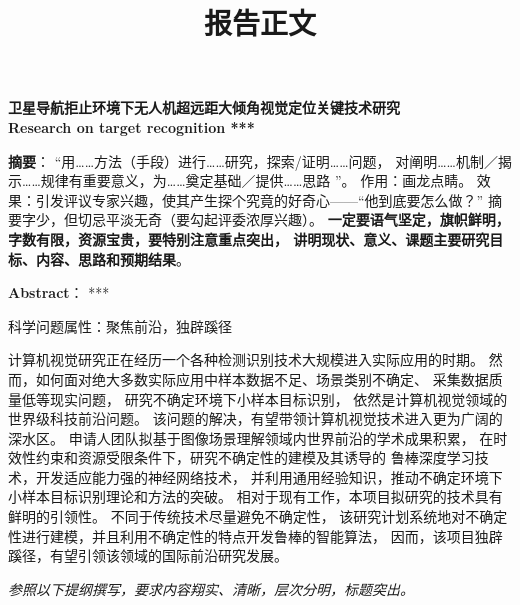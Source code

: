 \documentclass[12pt]{article}
\newcommand{\myEmph}[1]{\textbf{\textcolor[rgb]{0,0,0.25}{#1}}}
\begin{document}
\begin{center}\bf\Large 卫星导航拒止环境下无人机超远距大倾角视觉定位关键技术研究 \\

Research on target recognition *** 
\end{center}





\textbf{摘要}：
%
“用……方法（手段）进行……研究，探索/证明……问题，
对阐明……机制／揭示……规律有重要意义，为……奠定基础／提供……思路 ”。
作用：画龙点睛。
效果：引发评议专家兴趣，使其产生探个究竟的好奇心——“他到底要怎么做？”
摘要字少，但切忌平淡无奇（要勾起评委浓厚兴趣）。
\myEmph{一定要语气坚定，旗帜鲜明，字数有限，资源宝贵，要特别注意重点突出，
讲明现状、意义、课题主要研究目标、内容、思路和预期结果}。



\textbf{Abstract}：
***


科学问题属性：聚焦前沿，独辟蹊径



计算机视觉研究正在经历一个各种检测识别技术大规模进入实际应用的时期。
然而，如何面对绝大多数实际应用中样本数据不足、场景类别不确定、
采集数据质量低等现实问题，
研究不确定环境下小样本目标识别，
依然是计算机视觉领域的世界级科技前沿问题。
%
该问题的解决，有望带领计算机视觉技术进入更为广阔的深水区。
申请人团队拟基于图像场景理解领域内世界前沿的学术成果积累，
在时效性约束和资源受限条件下，研究不确定性的建模及其诱导的
鲁棒深度学习技术，开发适应能力强的神经网络技术，
并利用通用经验知识，推动不确定环境下小样本目标识别理论和方法的突破。
%
相对于现有工作，本项目拟研究的技术具有鲜明的引领性。
不同于传统技术尽量避免不确定性，
该研究计划系统地对不确定性进行建模，并且利用不确定性的特点开发鲁棒的智能算法，
因而，该项目独辟蹊径，有望引领该领域的国际前沿研究发展。


\clearpage


\title{报告正文}

\maketitle

\emph{\large 参照以下提纲撰写，要求内容翔实、清晰，层次分明，标题突出。
}




\end{document}

